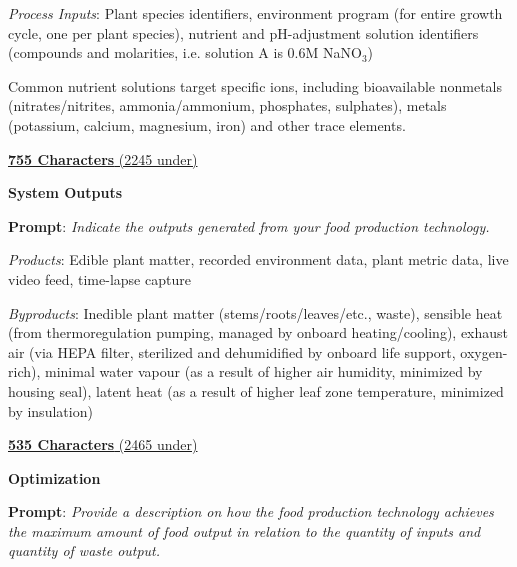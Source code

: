 \documentclass{report}
\begin{document}
\textit{Process Inputs}: Plant species identifiers, environment program (for entire growth cycle, one per plant species), nutrient and pH-adjustment solution identifiers (compounds and molarities, i.e. solution A is 0.6M NaNO${}_3$)

Common nutrient solutions target specific ions, including bioavailable nonmetals (nitrates/nitrites, ammonia/ammonium, phosphates, sulphates), metals (potassium, calcium, magnesium, iron) and other trace elements.

\uline{\textbf{755 Characters} (2245 under)}

\vspace{0.5cm}

\textbf{System Outputs}
\label{sec:resource-outputs}

\textbf{Prompt}: \textit{Indicate the outputs generated from your food production technology. }


\textit{Products}: Edible plant matter, recorded environment data, plant metric data, live video feed, time-lapse capture

\textit{Byproducts}: Inedible plant matter (stems/roots/leaves/etc., waste), sensible heat (from thermoregulation pumping, managed by onboard heating/cooling), exhaust air (via HEPA filter, sterilized and dehumidified by onboard life support, oxygen-rich), minimal water vapour (as a result of higher air humidity, minimized by housing seal), latent heat (as a result of higher leaf zone temperature, minimized by insulation)

\uline{\textbf{535 Characters} (2465 under)}

\newpage

\textbf{Optimization}
\label{sec:resource-optimization}

\textbf{Prompt}: \textit{Provide a description on how the food production technology achieves the maximum amount of food output in relation to the quantity of inputs and quantity of waste output.} 

\end{document}
